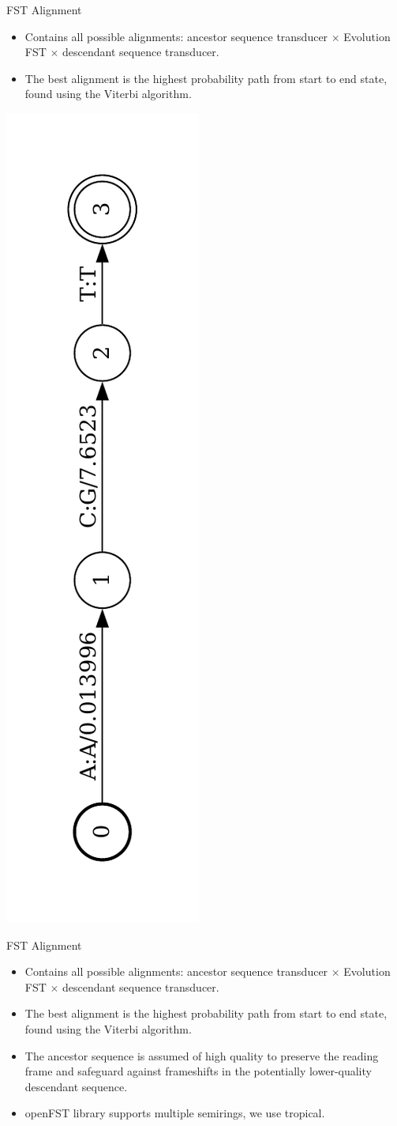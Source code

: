 \documentclass[aspectratio=169,font=14pt]{beamer}
\begin{document}
\begin{frame}[t,noframenumbering]{FST Alignment} %
\begin{itemize}
    \item Contains all possible alignments: ancestor sequence transducer $\times$ Evolution FST $\times$ descendant sequence transducer.
    \item The best alignment is the highest probability path from start to end state, found using the Viterbi algorithm.
\end{itemize}
\centering
\includegraphics[width=\textheight,height=0.8\textwidth,keepaspectratio,angle=-90]{defense/figures/path-fst.pdf}
\end{frame} %

\begin{frame}[t,noframenumbering]{FST Alignment} %
\begin{itemize}
    \item Contains all possible alignments: ancestor sequence transducer $\times$ Evolution FST $\times$ descendant sequence transducer.
    \item The best alignment is the highest probability path from start to end state, found using the Viterbi algorithm.
    \item The ancestor sequence is assumed of high quality to preserve the reading frame and safeguard against frameshifts in the potentially lower-quality descendant sequence.
    \item openFST library supports multiple semirings, we use tropical.
\end{itemize}
\centering

\end{frame} %
\end{document}
